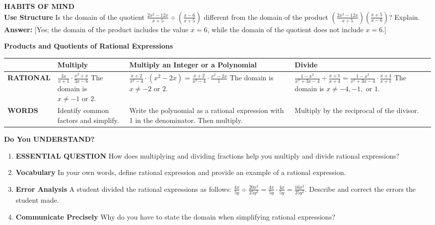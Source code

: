 \documentclass{article}
\newenvironment{concept-box}{}{}
\newenvironment{concept-summary}{}{}
\newcommand{\answer}[1]{\textbf{Answer:} #1}
\begin{document}
\begin{concept-box}
\textbf{HABITS OF MIND} \\
\textbf{Use Structure} Is the domain of the quotient $\frac{2x^2 - 12x}{x+5} \div \left(\frac{x - 6}{x+5}\right)$ different from the domain of the product $\left(\frac{2x^2 - 12x}{x+5}\right)\left(\frac{x+5}{x-6}\right)$? Explain. \\
\answer{[Yes; the domain of the product includes the value $x = 6$, while the domain of the quotient does not include $x = 6$.]}
\end{concept-box}

\begin{concept-summary}
\textbf{Products and Quotients of Rational Expressions}

\begin{tabular}{lp{4cm}p{4cm}p{4cm}}
\toprule
& \textbf{Multiply} & \textbf{Multiply an Integer or a Polynomial} & \textbf{Divide} \\
\midrule
\textbf{RATIONAL} &
$\frac{3x}{x+1} \cdot \frac{x^2+x}{3x-6}$ \newline The domain is $x \neq -1 \text{ or } 2$. &
$\frac{x+2}{x^2-4} \cdot (x^2-2x) = \frac{x+2}{x^2-4} \cdot \frac{x^2-2x}{1}$ \newline The domain is $x \neq -2 \text{ or } 2$. &
$\frac{1-x^2}{x^2+3x-4} \div \frac{x+1}{x+4} = \frac{1-x^2}{x^2+3x-4} \cdot \frac{x+4}{x+1}$ \newline The domain is $x \neq -4, -1, \text{ or } 1$. \\
\midrule
\textbf{WORDS} &
Identify common factors and simplify. &
Write the polynomial as a rational expression with 1 in the denominator. Then multiply. &
Multiply by the reciprocal of the divisor. \\
\bottomrule
\end{tabular}

\textbf{Do You UNDERSTAND?}
\begin{enumerate}
    \item \textbf{ESSENTIAL QUESTION} How does multiplying and dividing fractions help you multiply and divide rational expressions?
    \item \textbf{Vocabulary} In your own words, define rational expression and provide an example of a rational expression.
    \item \textbf{Error Analysis} A student divided the rational expressions as follows:
    $\frac{4x}{5y} \div \frac{20x^2}{25y^2} = \frac{4x}{5y} \cdot \frac{4x}{5y} = \frac{16x^2}{25y^2}$. Describe and correct the errors the student made.
    \item \textbf{Communicate Precisely} Why do you have to state the domain when simplifying rational expressions?
\end{enumerate}


\end{concept-summary}
\end{document}

